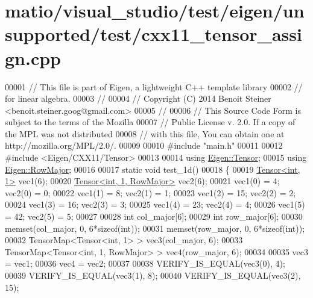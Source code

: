 \hypertarget{matio_2visual__studio_2test_2eigen_2unsupported_2test_2cxx11__tensor__assign_8cpp_source}{}\section{matio/visual\+\_\+studio/test/eigen/unsupported/test/cxx11\+\_\+tensor\+\_\+assign.cpp}
\label{matio_2visual__studio_2test_2eigen_2unsupported_2test_2cxx11__tensor__assign_8cpp_source}

\begin{DoxyCode}
00001 \textcolor{comment}{// This file is part of Eigen, a lightweight C++ template library}
00002 \textcolor{comment}{// for linear algebra.}
00003 \textcolor{comment}{//}
00004 \textcolor{comment}{// Copyright (C) 2014 Benoit Steiner <benoit.steiner.goog@gmail.com>}
00005 \textcolor{comment}{//}
00006 \textcolor{comment}{// This Source Code Form is subject to the terms of the Mozilla}
00007 \textcolor{comment}{// Public License v. 2.0. If a copy of the MPL was not distributed}
00008 \textcolor{comment}{// with this file, You can obtain one at http://mozilla.org/MPL/2.0/.}
00009 
00010 \textcolor{preprocessor}{#include "main.h"}
00011 
00012 \textcolor{preprocessor}{#include <Eigen/CXX11/Tensor>}
00013 
00014 \textcolor{keyword}{using} \hyperlink{class_eigen_1_1_tensor}{Eigen::Tensor};
00015 \textcolor{keyword}{using} \hyperlink{group__enums_ggaacded1a18ae58b0f554751f6cdf9eb13acfcde9cd8677c5f7caf6bd603666aae3}{Eigen::RowMajor};
00016 
00017 \textcolor{keyword}{static} \textcolor{keywordtype}{void} test\_1d()
00018 \{
00019   \hyperlink{class_eigen_1_1_tensor}{Tensor<int, 1>} vec1(6);
00020   \hyperlink{class_eigen_1_1_tensor}{Tensor<int, 1, RowMajor>} vec2(6);
00021   vec1(0) = 4;  vec2(0) = 0;
00022   vec1(1) = 8;  vec2(1) = 1;
00023   vec1(2) = 15; vec2(2) = 2;
00024   vec1(3) = 16; vec2(3) = 3;
00025   vec1(4) = 23; vec2(4) = 4;
00026   vec1(5) = 42; vec2(5) = 5;
00027 
00028   \textcolor{keywordtype}{int} col\_major[6];
00029   \textcolor{keywordtype}{int} row\_major[6];
00030   memset(col\_major, 0, 6*\textcolor{keyword}{sizeof}(\textcolor{keywordtype}{int}));
00031   memset(row\_major, 0, 6*\textcolor{keyword}{sizeof}(\textcolor{keywordtype}{int}));
00032   TensorMap<Tensor<int, 1> > vec3(col\_major, 6);
00033   TensorMap<Tensor<int, 1, RowMajor> > vec4(row\_major, 6);
00034 
00035   vec3 = vec1;
00036   vec4 = vec2;
00037 
00038   VERIFY\_IS\_EQUAL(vec3(0), 4);
00039   VERIFY\_IS\_EQUAL(vec3(1), 8);
00040   VERIFY\_IS\_EQUAL(vec3(2), 15);

\end{DoxyCode}
